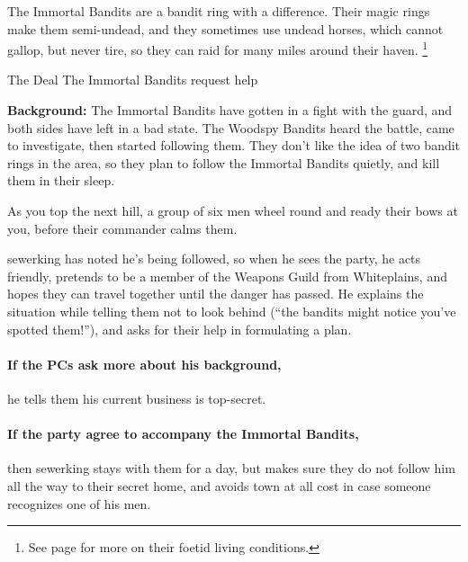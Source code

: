 \resumecontents[Town]

\stopcontents[sq]


\stopcontents[Town]

\startcontents[sq]

\sqminitoc

\noindent
The Immortal Bandits are a bandit ring with a difference.
Their magic rings make them semi-undead, and they sometimes use undead horses, which cannot gallop, but never tire, so they can raid for many miles around their haven.%
\footnote{See page \pageref{necromancers_lair} for more on their foetid living conditions.}

{The Deal}%
{The Immortal Bandits request help}%

\textbf{Background:}
The Immortal Bandits have gotten in a fight with the \gls{guard}, and both sides have left in a bad state.
The Woodspy Bandits heard the battle, came to investigate, then started following them.
They don't like the idea of two bandit rings in the area, so they plan to follow the Immortal Bandits quietly, and kill them in their sleep.

\begin{boxtext}

  As you top the next hill, a group of six men wheel round and ready their bows at you, before their commander calms them.

\end{boxtext}

\Gls{sewerking} has noted he's being followed, so when he sees the party, he acts friendly, pretends to be a member of the Weapons Guild from Whiteplains, and hopes they can travel together until the danger has passed.
He explains the situation while telling them not to look behind (``the bandits might notice you've spotted them!''), and asks for their help in formulating a plan.

\paragraph{If the PCs ask more about his background,}
he tells them his current business is top-secret.


\sewerking


\paragraph{If the party agree to accompany the Immortal Bandits,}
then \gls{sewerking} stays with them for a day, but makes sure they do not follow him all the way to their secret home, and avoids town at all cost in case someone recognizes one of his men.

